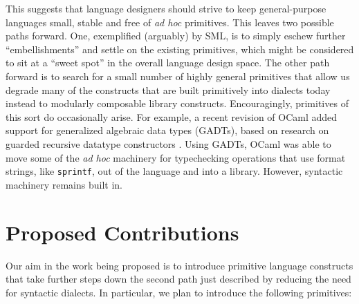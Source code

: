 This suggests that language designers should strive to keep general-purpose languages small, stable and free of \emph{ad hoc} primitives. This leaves  two possible paths forward. One, exemplified (arguably) by SML, is to simply eschew further ``embellishments'' and settle on the existing primitives, which might be considered to sit at a ``sweet spot'' in the overall language design space. %
The other path forward is to search for a small number of highly general primitives that allow us degrade many of the constructs that are built primitively into dialects today instead to modularly composable library constructs. 
Encouragingly, primitives of this sort do occasionally arise. For example, a recent revision of OCaml added support for  generalized algebraic data types (GADTs), based on research on guarded recursive datatype constructors \cite{XiCheChe03}. Using GADTs, OCaml was able to move some of the \emph{ad hoc} machinery for typechecking operations that use format strings, like \texttt{sprintf}, out of the language and into a library. However, syntactic machinery remains  built in. 



\section{Proposed Contributions}
Our aim in the work being proposed is to introduce primitive language constructs that take further steps down the second path just described by reducing the need for syntactic dialects. In particular, we plan to introduce the following primitives:

